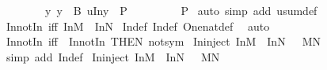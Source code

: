 \begin{isabellebody}
\ \ \ \ \ \ \ \ {\isasymAnd}y{\isachardot}\ {\isasymlbrakk}y\ {\isasymin}\ B{\isacharsemicolon}\ u{\isacharequal}In{}{\isacharparenleft}y{\isacharparenright}{\isasymrbrakk}\ {\isasymLongrightarrow}\ P\ \ \isanewline
\ \ \ \ \ {\isasymrbrakk}\ {\isasymLongrightarrow}\ P{\isachardoublequoteclose}\isanewline
%
\isadelimproof
%
\endisadelimproof
%
\isatagproof
{}\isamarkupfalse%
\ {\isacharparenleft}auto\ simp\ add{\isacharcolon}\ usum{\isacharunderscore}def{\isacharparenright}%
\endisatagproof
{\isafoldproof}%
%
\isadelimproof
\isanewline
%
\endisadelimproof
\isanewline
\isanewline
\isanewline
\isanewline
{}\isamarkupfalse%
\ In{}{\isacharunderscore}not{\isacharunderscore}In{}\ {\isacharbrackleft}iff{\isacharbrackright}{\isacharcolon}\ {\isachardoublequoteopen}In{}{\isacharparenleft}M{\isacharparenright}\ {\isasymnoteq}\ In{}{\isacharparenleft}N{\isacharparenright}{\isachardoublequoteclose}\isanewline
%
\isadelimproof
%
\endisadelimproof
%
\isatagproof
{}\isamarkupfalse%
\ In{}{\isacharunderscore}def\ In{}{\isacharunderscore}def\ One{\isacharunderscore}nat{\isacharunderscore}def\ \isamarkupfalse%
\ auto%
\endisatagproof
{\isafoldproof}%
%
\isadelimproof
\isanewline
%
\endisadelimproof
\isanewline
{}\isamarkupfalse%
\ In{}{\isacharunderscore}not{\isacharunderscore}In{}\ {\isacharbrackleft}iff{\isacharbrackright}\ {\isacharequal}\ In{}{\isacharunderscore}not{\isacharunderscore}In{}\ {\isacharbrackleft}THEN\ not{\isacharunderscore}sym{\isacharbrackright}\isanewline
\isanewline
{}\isamarkupfalse%
\ In{}{\isacharunderscore}inject{\isacharcolon}\ {\isachardoublequoteopen}In{}{\isacharparenleft}M{\isacharparenright}\ {\isacharequal}\ In{}{\isacharparenleft}N{\isacharparenright}\ {\isacharequal}{\isacharequal}{\isachargreater}\ \ M{\isacharequal}N{\isachardoublequoteclose}\isanewline
%
\isadelimproof
%
\endisadelimproof
%
\isatagproof
{}\isamarkupfalse%
\ {\isacharparenleft}simp\ add{\isacharcolon}\ In{}{\isacharunderscore}def{\isacharparenright}%
\endisatagproof
{\isafoldproof}%
%
\isadelimproof
\isanewline
%
\endisadelimproof
\isanewline
{}\isamarkupfalse%
\ In{}{\isacharunderscore}inject{\isacharcolon}\ {\isachardoublequoteopen}In{}{\isacharparenleft}M{\isacharparenright}\ {\isacharequal}\ In{}{\isacharparenleft}N{\isacharparenright}\ {\isacharequal}{\isacharequal}{\isachargreater}\ \ M{\isacharequal}N{\isachardoublequoteclose}\isanewline

\end{isabellebody}
